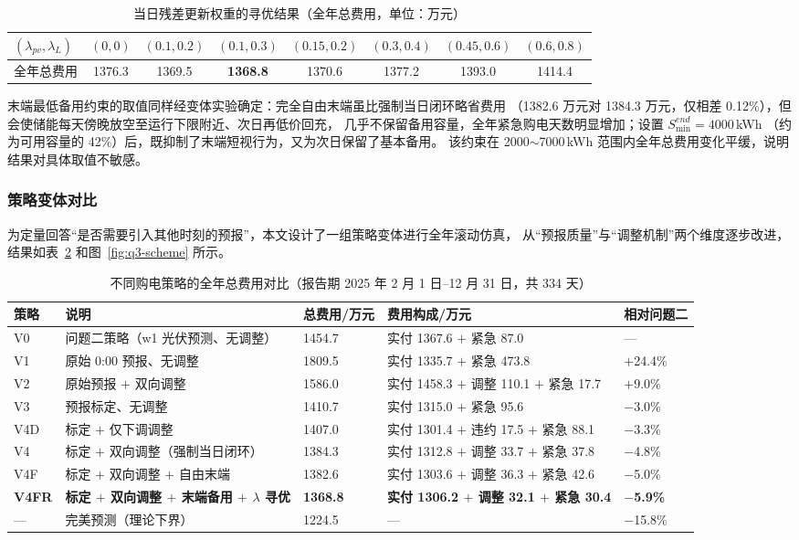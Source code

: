 \begin{table}[!htbp]
\caption{当日残差更新权重的寻优结果（全年总费用，单位：万元）}\label{tab:q3-lambda}
\centering
\small
\begin{tabular}{lccccccc}
\toprule
$(\lambda_{pv},\lambda_L)$ & $(0,0)$ & $(0.1,0.2)$ & $(0.1,0.3)$ & $(0.15,0.2)$ & $(0.3,0.4)$ & $(0.45,0.6)$ & $(0.6,0.8)$ \\
\midrule
全年总费用 & 1376.3 & 1369.5 & \textbf{1368.8} & 1370.6 & 1377.2 & 1393.0 & 1414.4 \\
\bottomrule
\end{tabular}
\end{table}

末端最低备用约束的取值同样经变体实验确定：完全自由末端虽比强制当日闭环略省费用
（1382.6 万元对 1384.3 万元，仅相差 0.12\%），但会使储能每天傍晚放空至运行下限附近、次日再低价回充，
几乎不保留备用容量，全年紧急购电天数明显增加；设置 $S^{end}_{\min}=4000$\,kWh
（约为可用容量的 42\%）后，既抑制了末端短视行为，又为次日保留了基本备用。
该约束在 2000$\sim$7000\,kWh 范围内全年总费用变化平缓，说明结果对具体取值不敏感。

\subsubsection{策略变体对比}
为定量回答“是否需要引入其他时刻的预报”，本文设计了一组策略变体进行全年滚动仿真，
从“预报质量”与“调整机制”两个维度逐步改进，结果如表~\ref{tab:q3-variant} 和图~\ref{fig:q3-scheme} 所示。

\begin{table}[!htbp]
\caption{不同购电策略的全年总费用对比（报告期 2025 年 2 月 1 日--12 月 31 日，共 334 天）}\label{tab:q3-variant}
\centering
\small
\setlength{\tabcolsep}{4pt}
\begin{tabular}{lllll}
\toprule
策略 & 说明 & 总费用/万元 & 费用构成/万元 & 相对问题二 \\
\midrule
V0 & 问题二策略（w1 光伏预测、无调整） & 1454.7 & 实付 1367.6 $+$ 紧急 87.0 & --- \\
V1 & 原始 0:00 预报、无调整 & 1809.5 & 实付 1335.7 $+$ 紧急 473.8 & $+$24.4\% \\
V2 & 原始预报 $+$ 双向调整 & 1586.0 & 实付 1458.3 $+$ 调整 110.1 $+$ 紧急 17.7 & $+$9.0\% \\
V3 & 预报标定、无调整 & 1410.7 & 实付 1315.0 $+$ 紧急 95.6 & $-$3.0\% \\
V4D & 标定 $+$ 仅下调调整 & 1407.0 & 实付 1301.4 $+$ 违约 17.5 $+$ 紧急 88.1 & $-$3.3\% \\
V4 & 标定 $+$ 双向调整（强制当日闭环） & 1384.3 & 实付 1312.8 $+$ 调整 33.7 $+$ 紧急 37.8 & $-$4.8\% \\
V4F & 标定 $+$ 双向调整 $+$ 自由末端 & 1382.6 & 实付 1303.6 $+$ 调整 36.3 $+$ 紧急 42.6 & $-$5.0\% \\
\textbf{V4FR} & \textbf{标定 $+$ 双向调整 $+$ 末端备用 $+$ $\lambda$ 寻优} & \textbf{1368.8} & \textbf{实付 1306.2 $+$ 调整 32.1 $+$ 紧急 30.4} & \textbf{$-$5.9\%} \\
--- & 完美预测（理论下界） & 1224.5 & --- & $-$15.8\% \\
\bottomrule
\end{tabular}
\end{table}

